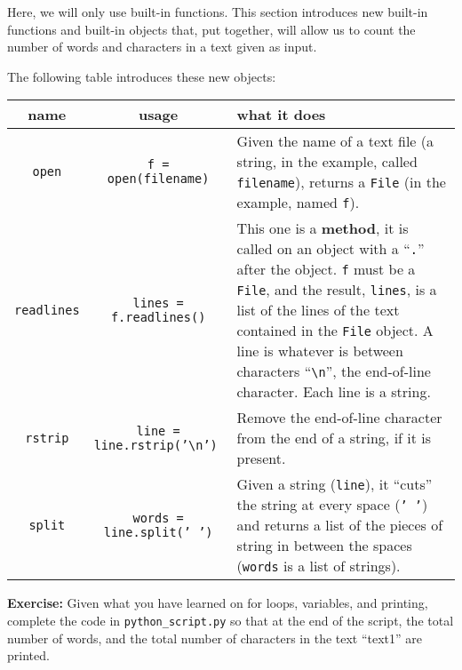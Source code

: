 \documentclass{article}
\newcommand{\exercise}[1]{
\begin{mdframed}[backgroundcolor=black!20!white]
\textbf{Exercise:} #1
\end{mdframed}
}
\begin{document}
Here, we will only use built-in functions. This section introduces
new built-in functions and built-in objects that, put together,
will allow us to count the number of words and characters in a
text given as input.

The following table introduces these new objects:

\begin{center}
\begin{tabular}{|c|c|m{7cm}|}
    \hline
    name & usage & what it does \\
    \hline
    {\tt open} & {\tt f = open(filename)} & Given the name of a text file (a string, in the example, called {\tt filename}), returns a {\tt File} (in the example, named {\tt f}). \\
    \hline
    {\tt readlines} & {\tt lines = f.readlines()} & This one is a \textbf{method},
    it is called on an object with a ``{\tt .}'' after the object. {\tt f} must be
    a {\tt File}, and the result, {\tt lines}, is a list of the lines of
    the text contained in the {\tt File} object. A line is whatever
    is between characters ``{\tt \textbackslash n}'', the end-of-line
    character. Each line
    is a string.\\
    \hline
    {\tt rstrip} & {\tt line = line.rstrip('\textbackslash n') } & Remove the end-of-line character from the end of a string, if it is present. \\ 
    \hline
    {\tt split} & {\tt words = line.split(' ')} & Given a string ({\tt line}),
    it ``cuts'' the string at every space ({\tt ' '}) and returns a list
    of the pieces of string in between the spaces ({\tt words} is a list of 
    strings).\\
    \hline
\end{tabular}
\end{center}

\exercise{
Given what you have learned on for loops,  variables, and printing, complete the
code in {\tt python\_script.py} so that at the end of the script, the total
number of words, and the total number of characters in the text ``text1'' are
printed. 
}
\end{document}
